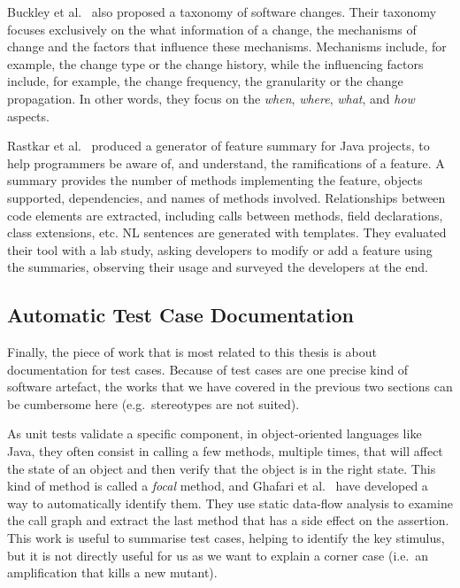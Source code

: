 \documentclass[a4paper,11pt]{sdm_internship}
\theoremstyle{definition}
\begin{document}
Buckley et al.~\cite{buckley2005towards} also proposed a taxonomy of software changes.
Their taxonomy focuses exclusively on the what information of a change, the mechanisms of change and the factors that influence these mechanisms.
Mechanisms include, for example, the change type or the change history, while the influencing factors include, for example, the change frequency, the granularity or the change propagation.
In other words, they focus on the \textit{when}, \textit{where}, \textit{what}, and \textit{how} aspects.

Rastkar et al.~\cite{rastkar2011generating} produced a generator of feature summary for Java projects, to help programmers be aware of, and understand, the ramifications of a feature.
A summary provides the number of methods implementing the feature, objects supported, dependencies, and names of methods involved.
Relationships between code elements are extracted, including calls between methods, field declarations, class extensions, etc.
NL sentences are generated with templates.
They evaluated their tool with a lab study, asking developers to modify or add a feature using the summaries, observing their usage and surveyed the developers at the end.

\subsection{Automatic Test Case Documentation}%
\label{ssec:test_doc}
Finally, the piece of work that is most related to this thesis is about documentation for test cases.
Because of test cases are one precise kind of software artefact, the works that we have covered in the previous two sections can be cumbersome here (e.g.\ stereotypes are not suited).

As unit tests validate a specific component, in object-oriented languages like Java, they often consist in calling a few methods, multiple times, that will affect the state of an object and then verify that the object is in the right state.
This kind of method is called a \emph{focal} method, and Ghafari et al.~\cite{ghafari2015automatically} have developed a way to automatically identify them.
They use static data-flow analysis to examine the call graph and extract the last method that has a side effect on the assertion.
This work is useful to summarise test cases, helping to identify the key stimulus, but it is not directly useful for us as we want to explain a corner case (i.e.\ an amplification that kills a new mutant).
\end{document}
